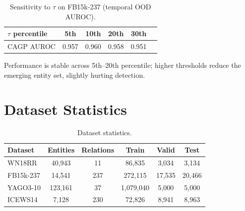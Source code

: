 \documentclass[accepted]{uai2024}  %
\begin{document}
\begin{table}[h]
\centering
\caption{Sensitivity to $\tau$ on FB15k-237 (temporal OOD AUROC).}
\label{tab:tau}
\small
\begin{tabular}{lccccc}
\toprule
$\tau$ percentile & 5th & 10th & 20th & 30th \\
\midrule
CAGP AUROC & 0.957 & 0.960 & 0.958 & 0.951 \\
\bottomrule
\end{tabular}
\end{table}

Performance is stable across 5th--20th percentile; higher thresholds reduce the emerging entity set, slightly hurting detection.

\section{Dataset Statistics}
\label{app:datasets}

\begin{table}[h]
\centering
\caption{Dataset statistics.}
\begin{tabular}{lccccc}
\toprule
Dataset & Entities & Relations & Train & Valid & Test \\
\midrule
WN18RR & 40,943 & 11 & 86,835 & 3,034 & 3,134 \\
FB15k-237 & 14,541 & 237 & 272,115 & 17,535 & 20,466 \\
YAGO3-10 & 123,161 & 37 & 1,079,040 & 5,000 & 5,000 \\
ICEWS14 & 7,128 & 230 & 72,826 & 8,941 & 8,963 \\
\bottomrule
\end{tabular}
\end{table}
\end{document}

